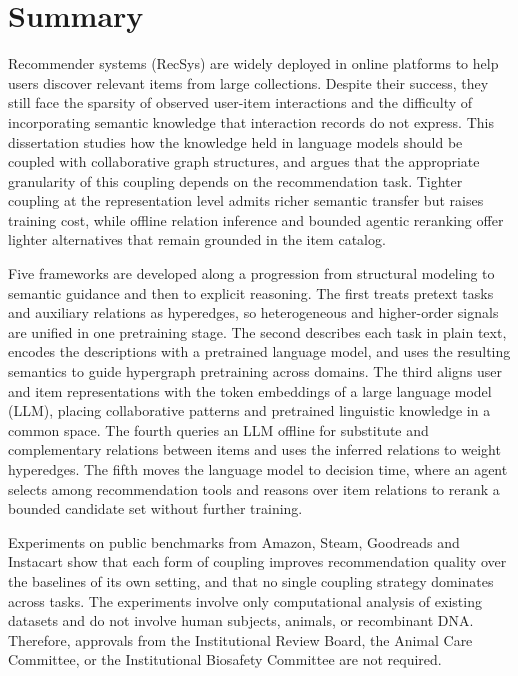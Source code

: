 \chapter*{Summary}
Recommender systems (RecSys) are widely deployed in online platforms to help users discover relevant items from large collections. Despite their success, they still face the sparsity of observed user-item interactions and the difficulty of incorporating semantic knowledge that interaction records do not express. This dissertation studies how the knowledge held in language models should be coupled with collaborative graph structures, and argues that the appropriate granularity of this coupling depends on the recommendation task. Tighter coupling at the representation level admits richer semantic transfer but raises training cost, while offline relation inference and bounded agentic reranking offer lighter alternatives that remain grounded in the item catalog.

Five frameworks are developed along a progression from structural modeling to semantic guidance and then to explicit reasoning. The first treats pretext tasks and auxiliary relations as hyperedges, so heterogeneous and higher-order signals are unified in one pretraining stage. The second describes each task in plain text, encodes the descriptions with a pretrained language model, and uses the resulting semantics to guide hypergraph pretraining across domains. The third aligns user and item representations with the token embeddings of a large language model (LLM), placing collaborative patterns and pretrained linguistic knowledge in a common space. The fourth queries an LLM offline for substitute and complementary relations between items and uses the inferred relations to weight hyperedges. The fifth moves the language model to decision time, where an agent selects among recommendation tools and reasons over item relations to rerank a bounded candidate set without further training.

Experiments on public benchmarks from Amazon, Steam, Goodreads and Instacart show that each form of coupling improves recommendation quality over the baselines of its own setting, and that no single coupling strategy dominates across tasks. The experiments involve only computational analysis of existing datasets and do not involve human subjects, animals, or recombinant DNA. Therefore, approvals from the Institutional Review Board, the Animal Care Committee, or the Institutional Biosafety Committee are not required.
